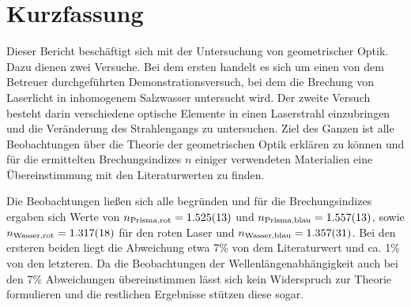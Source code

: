 \section{Kurzfassung}

	Dieser Bericht beschäftigt sich mit der Untersuchung von geometrischer Optik.
	Dazu dienen zwei Versuche.
	Bei dem ersten handelt es sich um einen von dem Betreuer durchgeführten Demonstrationsversuch, bei dem die Brechung von Laserlicht in inhomogenem Salzwasser untersucht wird.
	Der zweite Versuch besteht darin verschiedene optische Elemente in einen Laserstrahl einzubringen und die Veränderung des Strahlengangs zu untersuchen.
	Ziel des Ganzen ist alle Beobachtungen über die Theorie der geometrischen Optik erklären zu können und für die ermittelten Brechungsindizes $n$ einiger verwendeten Materialien eine Übereinstimmung mit den Literaturwerten zu finden. 
	
	Die Beobachtungen ließen sich alle begründen und für die Brechungsindizes ergaben sich Werte von  $n_\text{Prisma,rot} = \SI{1.525+-0.013}{}$ und $n_\text{Prisma,blau} = \SI{1.557+-0.013}{}$, sowie $n_\text{Wasser,rot} = \SI{1.317+-0.018}{}$ für den roten Laser und $n_\text{Wasser,blau} = \SI{1.357+-0.031}{}$.
	Bei den ersteren beiden liegt die Abweichung etwa 7\% von dem Literaturwert und ca. 1\% von den letzteren.
	Da die Beobachtungen der Wellenlängenabhängigkeit auch bei den 7\% Abweichungen übereinstimmen lässt sich kein Widerspruch zur Theorie formulieren und die restlichen Ergebnisse stützen diese sogar.